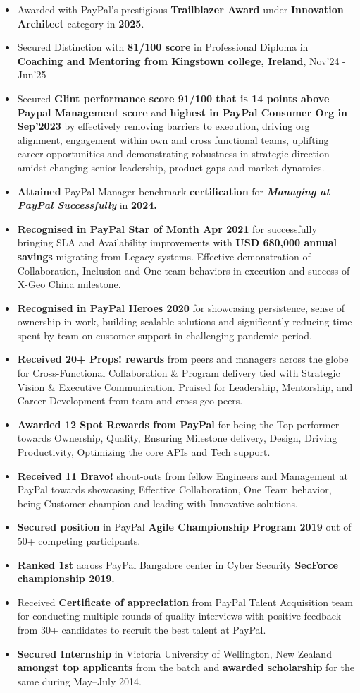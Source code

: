 \documentclass[10pt,letterpaper]{article}
\newcommand{\bd}[1]{\textbf{#1}}
\begin{document}
\begin{itemize}
\item Awarded with PayPal's prestigious \bd{Trailblazer Award} under \bd{Innovation Architect} category in \bd{2025}.
\item Secured Distinction with \bd{81/100 score} in Professional Diploma in \bd{Coaching and Mentoring from Kingstown college, Ireland},
  Nov'24 - Jun'25
\item Secured \bd{Glint performance score 91/100 that is 14 points above Paypal Management
  score} and \bd{highest in PayPal Consumer Org in Sep'2023} by effectively removing
  barriers to execution, driving org alignment, engagement within own and cross functional
  teams, uplifting career opportunities and demonstrating robustness in strategic direction
  amidst changing senior leadership, product gaps and market dynamics.
\item \bd{Attained} PayPal Manager benchmark \bd{certification} for
  \textbf{\textit{Managing at PayPal Successfully}} in \bd{2024.}
\item \bd{Recognised in PayPal Star of Month Apr 2021} for successfully bringing SLA and
  Availability improvements with \bd{USD 680,000 annual savings} migrating from Legacy
  systems. Effective demonstration of Collaboration, Inclusion and One team behaviors in
  execution and success of X-Geo China milestone.
\item \bd{Recognised in PayPal Heroes 2020} for showcasing persistence, sense of ownership
  in work, building scalable solutions and significantly reducing time spent by team on
  customer support in challenging pandemic period.
\item \bd{Received 20+ Props! rewards} from peers and managers across the globe for 
Cross-Functional Collaboration \& Program delivery tied with Strategic Vision \& Executive Communication. 
Praised for Leadership, Mentorship, and Career Development from team and cross-geo peers.
\item \bd{Awarded 12 Spot Rewards from PayPal} for being the Top performer towards
  Ownership, Quality, Ensuring Milestone delivery, Design, Driving Productivity, Optimizing
  the core APIs and Tech support.
\item \bd{Received 11 Bravo!} shout-outs from fellow Engineers and Management at PayPal
  towards showcasing Effective Collaboration, One Team behavior, being Customer champion
  and leading with Innovative solutions.
\item \bd{Secured position} in PayPal \bd{Agile Championship Program 2019} out of 50+
  competing participants.
\item \bd{Ranked 1st} across PayPal Bangalore center in Cyber Security \bd{SecForce
  championship 2019.}
\item Received \bd{Certificate of appreciation} from PayPal Talent Acquisition team for
  conducting multiple rounds of quality interviews with positive feedback from 30+
  candidates to recruit the best talent at PayPal.
\item \bd{Secured Internship} in Victoria University of Wellington, New Zealand
  \bd{amongst top applicants} from the batch and \bd{awarded scholarship} for the same during
  May--July 2014.
\end{itemize}
\end{document}
